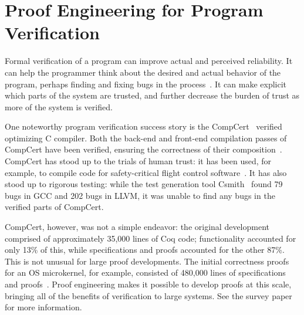 \section{Proof Engineering for Program Verification}
\label{sec:mot-prog}

Formal verification of a program can improve actual and perceived reliability.
It can help the programmer think about the desired and actual behavior of the program,
perhaps finding and fixing bugs in the process~\cite{murraybp}.
It can make explicit which parts of the system are trusted, and further decrease the burden
of trust as more of the system is verified.

One noteworthy program verification success story is the CompCert~\cite{Leroy:POPL06, Leroy2009} verified optimizing C compiler.
Both the back-end and front-end compilation passes
of CompCert have been verified, ensuring the correctness of their composition~\cite{Kaestner2017}.
CompCert has stood up to the trials of human trust: it has been used, for example, to compile code for safety-critical flight control software~\cite{Frana2011}.
It has also stood up to rigorous testing: while the test generation tool Csmith~\cite{Yang2011} found 
79 bugs in GCC and 202 bugs in LLVM, it was unable to find any bugs in the verified parts of CompCert.

CompCert, however, was not a simple endeavor: the original development comprised of approximately 35,000 lines of Coq code;
functionality accounted for only 13\% of this, while specifications and proofs accounted for the other 87\%.
This is not unusual for large proof developments. The initial correctness proofs for an OS microkernel,
for example, consisted of 480,000 lines of specifications and proofs~\cite{Klein2014micro}.
Proof engineering makes it possible to develop proofs at this scale,
bringing all of the benefits of verification to large systems.
See the survey paper for more information.
